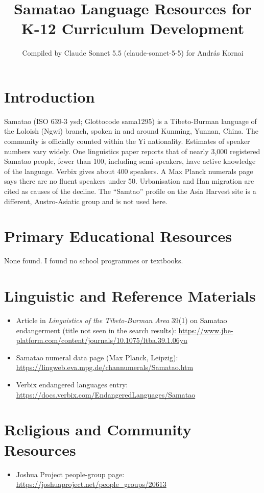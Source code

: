 \documentclass[12pt]{article}
\title{Samatao Language Resources for K-12 Curriculum Development}
\author{Compiled by Claude Sonnet 5.5 (claude-sonnet-5-5) for Andr\'as Kornai}
\date{}
\begin{document}
\maketitle

\section{Introduction}
Samatao (ISO 639-3 ysd; Glottocode sama1295) is a Tibeto-Burman language of the Loloish (Ngwi) branch, spoken in and around Kunming, Yunnan, China. The community is officially counted within the Yi nationality. Estimates of speaker numbers vary widely. One linguistics paper reports that of nearly 3,000 registered Samatao people, fewer than 100, including semi-speakers, have active knowledge of the language. Verbix gives about 400 speakers. A Max Planck numerals page says there are no fluent speakers under 50. Urbanisation and Han migration are cited as causes of the decline. The ``Samtao'' profile on the Asia Harvest site is a different, Austro-Asiatic group and is not used here.

\section{Primary Educational Resources}
None found. I found no school programmes or textbooks.

\section{Linguistic and Reference Materials}
\begin{itemize}
\item Article in \emph{Linguistics of the Tibeto-Burman Area} 39(1) on Samatao endangerment (title not seen in the search results): \url{https://www.jbe-platform.com/content/journals/10.1075/ltba.39.1.06yu}
\item Samatao numeral data page (Max Planck, Leipzig): \url{https://lingweb.eva.mpg.de/channumerals/Samatao.htm}
\item Verbix endangered languages entry: \url{https://docs.verbix.com/EndangeredLanguages/Samatao}
\end{itemize}

\section{Religious and Community Resources}
\begin{itemize}
\item Joshua Project people-group page: \url{https://joshuaproject.net/people_groups/20613}
\end{itemize}
\end{document}
